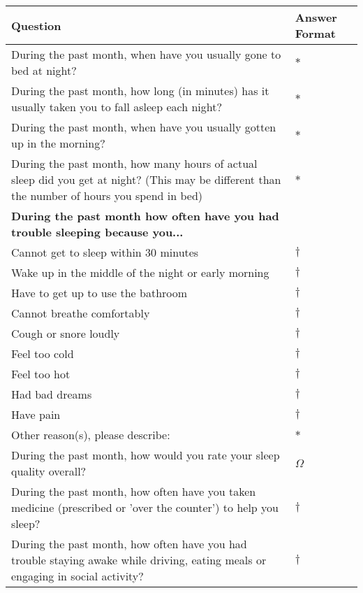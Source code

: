 \begin{table}[H]
    \centering
    \renewcommand{\arraystretch}{1.2}
    \begin{tabularx}{\textwidth}{|X|l|}
        \hline
        \textbf{Question} & \textbf{Answer Format} \\ \hline
        During the past month, when have you usually gone to bed at night? & $\ast$ \\ \hline
        During the past month, how long (in minutes) has it usually taken you to fall asleep each night? & $\ast$ \\ \hline
        During the past month, when have you usually gotten up in the morning? & $\ast$ \\ \hline
        During the past month, how many hours of actual sleep did you get at night? (This may be different than the number of hours you spend in bed) & $\ast$ \\ \hline
        \textbf{During the past month how often have you had trouble sleeping because you...} & \\ \hline
        \quad Cannot get to sleep within 30 minutes &  $\dagger$ \\ \hline
        \quad Wake up in the middle of the night or early morning & $\dagger$ \\ \hline
        \quad Have to get up to use the bathroom &  $\dagger$ \\ \hline
        \quad Cannot breathe comfortably &  $\dagger$ \\ \hline
        \quad Cough or snore loudly &  $\dagger$ \\ \hline
        \quad Feel too cold &  $\dagger$ \\ \hline
        \quad Feel too hot &  $\dagger$ \\ \hline
        \quad Had bad dreams &  $\dagger$ \\ \hline
        \quad Have pain &  $\dagger$ \\ \hline
        \quad Other reason(s), please describe: &  $\ast$ \\ \hline
        During the past month, how would you rate your sleep quality overall? & $\Omega$ \\ \hline
        During the past month, how often have you taken medicine (prescribed or 'over the counter') to help you sleep? & $\dagger$ \\ \hline
        During the past month, how often have you had trouble staying awake while driving, eating meals or engaging in social activity? & $\dagger$ \\ \hline

\end{tabularx}
\end{table}
